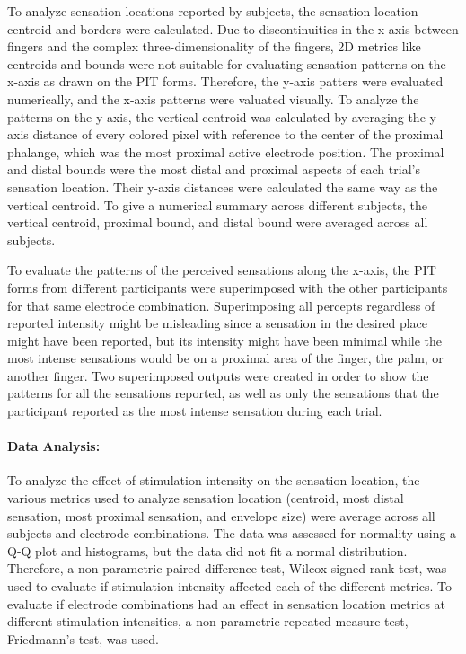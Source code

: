 \documentclass[10pt]{iopart}
\begin{document}
To analyze sensation locations reported by subjects, the sensation location centroid and borders were calculated. Due to discontinuities in the x-axis between fingers and the complex three-dimensionality of the fingers, 2D metrics like centroids and bounds were not suitable for evaluating sensation patterns on the x-axis as drawn on the PIT forms. Therefore, the y-axis patters were evaluated numerically, and the x-axis patterns were valuated visually. To analyze the patterns on the y-axis, the vertical centroid was calculated by averaging the y-axis distance of every colored pixel with reference to the center of the proximal phalange, which was the most proximal active electrode position. The proximal and distal bounds were the most distal and proximal aspects of each trial's sensation location. Their y-axis distances were calculated the same way as the vertical centroid. To give a numerical summary across different subjects, the vertical centroid, proximal bound, and distal bound were averaged across all subjects.

To evaluate the patterns of the perceived sensations along the x-axis, the PIT forms from different participants were superimposed with the other participants for that same electrode combination. Superimposing all percepts regardless of reported intensity might be misleading since a sensation in the desired place might have been reported, but its intensity might have been minimal while the most intense sensations would be on a proximal area of the finger, the palm, or another finger. Two superimposed outputs were created in order to show the patterns for all the sensations reported, as well as only the sensations that the participant reported as the most intense sensation during each trial.

\paragraph{Data Analysis:}
To analyze the effect of stimulation intensity on the sensation location, the various metrics used to analyze sensation location (centroid, most distal sensation, most proximal sensation, and envelope size) were average across all subjects and electrode combinations. The data was assessed for normality using a Q-Q plot and histograms, but the data did not fit a normal distribution. Therefore, a non-parametric paired difference test, Wilcox signed-rank test, was used to evaluate if stimulation intensity affected each of the different metrics. To evaluate if electrode combinations had an effect in sensation location metrics at different stimulation intensities, a non-parametric repeated measure test, Friedmann’s test, was used. 
\end{document}
